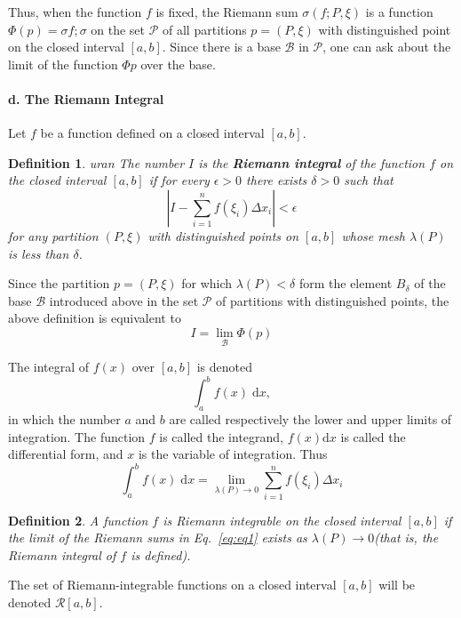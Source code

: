 \documentclass[a4paper,12pt]{article} %
\newtheorem{definition}{Definition}[section]
\begin{document}
Thus, when the function $f$ is fixed, the Riemann sum $\sigma(f;P,\xi)$ is a function 
$\Phi(p) = \sigma{f;\sigma}$ on the set $\mathcal{P}$ of all partitions $p = (P,\xi)$
with distinguished point on the closed interval $[a,b]$. Since there 
is a base $\mathcal{B}$ in $\mathcal{P}$, one can ask about the limit 
of the function $\Phi{p}$ over the base.

\paragraph{\rm \textbf{d. The Riemann Integral}}
Let $f$ be a function defined on a closed interval $[a,b]$.
\begin{definition}
    \normalfont
    uran
    The number $I$ is the \textbf{Riemann integral} of the function $f$ on the 
    closed interval $[a,b]$ if for every $\epsilon > 0$ there exists $\delta > 0$ 
    such that 
    \[
        \left\vert I - \sum_{i=1}^nf(\xi_i)\Delta x_i \right \vert < \epsilon
        \]
    for any partition $(P,\xi)$ with distinguished points on $[a,b]$ whose 
    mesh $\lambda(P)$ is less than $\delta$.
    \label{def:def1}
\end{definition}

Since the partition $p = (P,\xi)$ for which $\lambda(P) < \delta$ form the element 
$B_{\delta}$ of the base $\mathcal{B}$ introduced above in the set $\mathcal{P}$
of partitions with distinguished points, the above definition is  
equivalent to 
\[
    I = \lim_{\mathcal{B}}\Phi(p)
    \]

The integral of $f(x)$ over $[a,b]$ is denoted 
\[
    \int_a^bf(x)\;\mathrm{d}x,
    \]
in which the number $a$ and $b$ are called respectively the lower and 
upper limits of integration. The function $f$ is called the integrand, 
$f(x)\mathrm{d}x$ is called the differential form, and $x$  is the variable 
of integration. Thus 
\begin{equation}
    \int_a^bf(x)\;\mathrm{d}x = \lim_{\lambda(P)\to 0}\sum_{i=1}^nf(\xi_i)\Delta x_i
    \label{eq:eq1}
\end{equation}

\begin{definition}
    \normalfont 
    A function $f$ is Riemann integrable on the closed interval $[a,b]$
    if the limit of the Riemann sums in Eq.~\ref{eq:eq1} exists 
    as $\lambda(P)\to 0$(that is, the Riemann integral of $f$ is defined).
\end{definition}

The set of Riemann-integrable functions on a closed interval $[a,b]$
will be denoted $\mathcal{R}[a,b]$.
\end{document}
